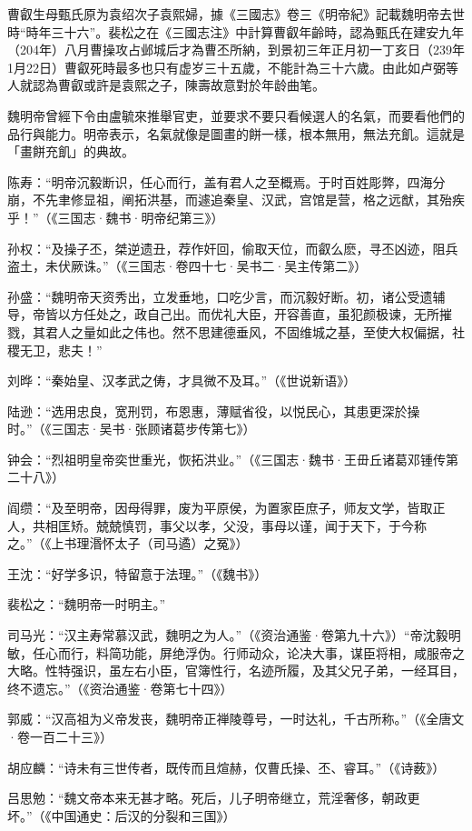 曹叡生母甄氏原为袁绍次子袁熙婦，據《三國志》卷三《明帝紀》記載魏明帝去世時“時年三十六”。裴松之在《三國志注》中計算曹叡年齡時，認為甄氏在建安九年（204年）八月曹操攻占邺城后才為曹丕所納，到景初三年正月初一丁亥日（239年1月22日）曹叡死時最多也只有虚岁三十五歲，不能計為三十六歲。由此如卢弼等人就認為曹叡或許是袁熙之子，陳壽故意對於年龄曲笔。

魏明帝曾經下令由盧毓來推舉官吏，並要求不要只看候選人的名氣，而要看他們的品行與能力。明帝表示，名氣就像是圖畫的餅一樣，根本無用，無法充飢。這就是「畫餅充飢」的典故。

陈寿：“明帝沉毅断识，任心而行，盖有君人之至概焉。于时百姓彫弊，四海分崩，不先聿修显祖，阐拓洪基，而遽追秦皇、汉武，宫馆是营，格之远猷，其殆疾乎！”（《三国志·魏书·明帝纪第三》）

孙权：“及操子丕，桀逆遗丑，荐作奸回，偷取天位，而叡么麽，寻丕凶迹，阻兵盗土，未伏厥诛。”（《三国志·卷四十七·吴书二·吴主传第二》）

孙盛：“魏明帝天资秀出，立发垂地，口吃少言，而沉毅好断。初，诸公受遗辅导，帝皆以方任处之，政自己出。而优礼大臣，开容善直，虽犯颜极谏，无所摧戮，其君人之量如此之伟也。然不思建德垂风，不固维城之基，至使大权偏据，社稷无卫，悲夫！”

刘晔：“秦始皇、汉孝武之俦，才具微不及耳。”（《世说新语》）

陆逊：“选用忠良，宽刑罚，布恩惠，薄赋省役，以悦民心，其患更深於操时。”（《三国志·吴书·张顾诸葛步传第七》）

钟会：“烈祖明皇帝奕世重光，恢拓洪业。”（《三国志·魏书·王毌丘诸葛邓锺传第二十八》）

阎缵：“及至明帝，因母得罪，废为平原侯，为置家臣庶子，师友文学，皆取正人，共相匡矫。兢兢慎罚，事父以孝，父没，事母以谨，闻于天下，于今称之。”（《上书理湣怀太子（司马遹）之冤》）

王沈：“好学多识，特留意于法理。”（《魏书》）

裴松之：“魏明帝一时明主。”

司马光：“汉主寿常慕汉武，魏明之为人。”（《资治通鉴·卷第九十六》）“帝沈毅明敏，任心而行，料简功能，屏绝浮伪。行师动众，论决大事，谋臣将相，咸服帝之大略。性特强识，虽左右小臣，官簿性行，名迹所履，及其父兄子弟，一经耳目，终不遗忘。”（《资治通鉴·卷第七十四》）

郭威：“汉高祖为义帝发丧，魏明帝正禅陵尊号，一时达礼，千古所称。”（《全唐文·卷一百二十三》）

胡应麟：“诗未有三世传者，既传而且煊赫，仅曹氏操、丕、睿耳。”（《诗薮》）

吕思勉：“魏文帝本来无甚才略。死后，儿子明帝继立，荒淫奢侈，朝政更坏。”（《中国通史：后汉的分裂和三国》）

